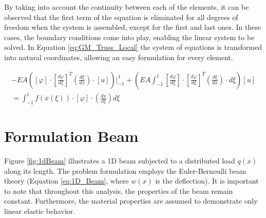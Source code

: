 \documentclass{article}
\begin{document}
By taking into account the continuity between each of the elements, it can be observed that the first term of the equation is eliminated for all degrees of freedom when the system is assembled, except for the first and last ones. In these cases, the boundary conditions come into play, enabling the linear system to be solved. In Equation \ref{eq:GM_Truss_Local} the system of equations is transformed into natural coordinates, allowing an easy formulation for every element.

\vspace{2ex}

\begin{equation}\label{eq:GM_Truss_Local}
\begin{aligned}
    -EA\left([\varphi]\cdot\left[\frac{d\varphi}{d\xi}\right]^T \left(\frac{d\xi}{dx}\right)\cdot [u]\right)\Bigg\rvert_{-1}^{1}+\left(EA\int_{-1}^{1}{ \left[\frac{d\varphi}{d\xi}\right] \cdot \left[\frac{d\varphi}{d\xi}\right]^T\left(\frac{d\xi}{dx}\right)\cdot d\xi}\right) [u]\\
    =\int_{-1}^{1}{f\left(x(\xi)\right) \cdot[\varphi]\cdot \left(\frac{dx}{d\xi}\right) d\xi}
\end{aligned}
\end{equation}

\vspace{2ex}


\section{Formulation Beam}

Figure \ref{fig:1dBeam}  illustrates a 1D beam subjected to a distributed load $q(x)$ along its length. The problem formulation employs the Euler-Bernoulli beam theory (Equation \ref{eq:1D_Beam}, where $w(x)$ is the deflection). It is important to note that throughout this analysis, the properties of the beam remain constant. Furthermore, the material properties are assumed to demonstrate only linear elastic behavior.


\vspace{2ex}
\end{document}
